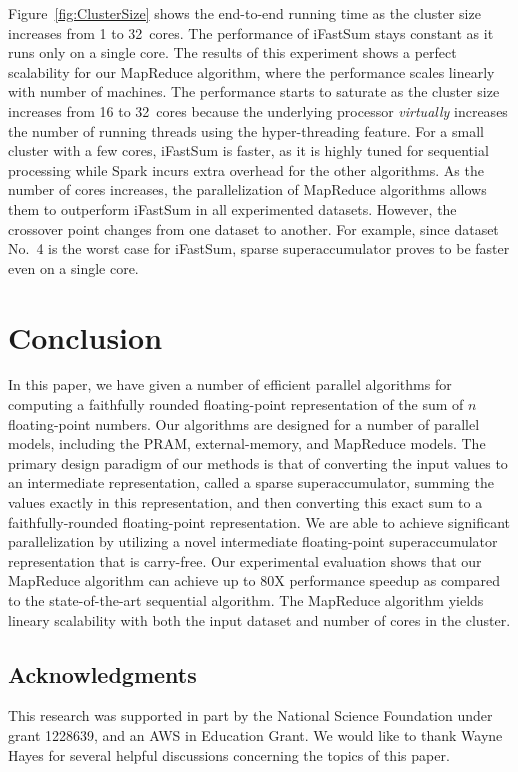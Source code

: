 \documentclass[11pt]{article}
\begin{document}
Figure~\ref{fig:ClusterSize} shows the end-to-end running time as
the cluster size increases from 1 to 32~cores. The performance of
iFastSum stays constant as it runs only on a single core. The results
of this experiment shows a perfect scalability for our MapReduce
algorithm, where the performance scales linearly with number of
machines. The performance starts to saturate as the cluster size
increases from 16 to 32~cores because the underlying processor 
{\em virtually} increases the number of running threads using the
hyper-threading feature. For a small cluster with a few cores,
iFastSum is faster, as it is highly tuned for sequential processing
while Spark incurs extra overhead for the other algorithms. As the
number of cores increases, the parallelization of MapReduce algorithms
allows them to outperform iFastSum in all experimented datasets.
However, the crossover point changes from one dataset to another.
For example, since dataset No.~4 is the worst case for iFastSum,
sparse superaccumulator proves to be faster even on a single core.
 

\section{Conclusion}
In this paper, we have given a number of efficient parallel algorithms
for computing a faithfully rounded floating-point representation of the
sum of $n$ floating-point numbers.  Our algorithms are designed for
a number of parallel models, including the PRAM, external-memory,
and MapReduce models. The primary design paradigm of our methods
is that of
converting the input values to an intermediate representation, called
a sparse superaccumulator, summing the values exactly in this representation,
and then converting this exact sum to a faithfully-rounded floating-point
representation.
\ifFull
We are able to achieve significant parallelization by utilizing a novel
intermediate floating-point superaccumulator representation that is carry-free.
\fi
Our experimental evaluation shows that our MapReduce algorithm can achieve
up to 80X performance speedup as compared to the state-of-the-art sequential algorithm.
The MapReduce algorithm yields lineary scalability with both the input dataset and
number of cores in the cluster.

\subsection*{Acknowledgments}
This research was supported in part by
the National Science Foundation under grant 1228639,
and an AWS in Education Grant.
We would like to thank Wayne Hayes for several helpful discussions
concerning the topics of this paper.

{\raggedright 
\small
 
 
}
\end{document}
